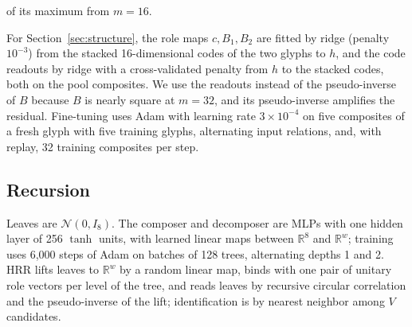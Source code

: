 \documentclass[10pt]{article}
\theoremstyle{plain}
\theoremstyle{remark}
\newcommand{\R}{\mathbb{R}}
\begin{document}
of its maximum from $m = 16$.

For Section~\ref{sec:structure}, the role maps $c, B_1, B_2$ are fitted by ridge (penalty $10^{-3}$) from the stacked 16-dimensional codes of the two glyphs to $h$, and the code readouts by ridge with a cross-validated penalty from $h$ to the stacked codes, both on the pool composites. We use the readouts instead of the pseudo-inverse of $B$ because $B$ is nearly square at $m = 32$, and its pseudo-inverse amplifies the residual. Fine-tuning uses Adam with learning rate $3 \times 10^{-4}$ on five composites of a fresh glyph with five training glyphs, alternating input relations, and, with replay, 32 training composites per step.

\subsection{Recursion}
Leaves are $\mathcal{N}(0, I_8)$. The composer and decomposer are MLPs with one hidden layer of 256 $\tanh$ units, with learned linear maps between $\R^8$ and $\R^w$; training uses 6{,}000 steps of Adam on batches of 128 trees, alternating depths 1 and 2. HRR lifts leaves to $\R^w$ by a random linear map, binds with one pair of unitary role vectors per level of the tree, and reads leaves by recursive circular correlation and the pseudo-inverse of the lift; identification is by nearest neighbor among $V$ candidates.
\end{document}
